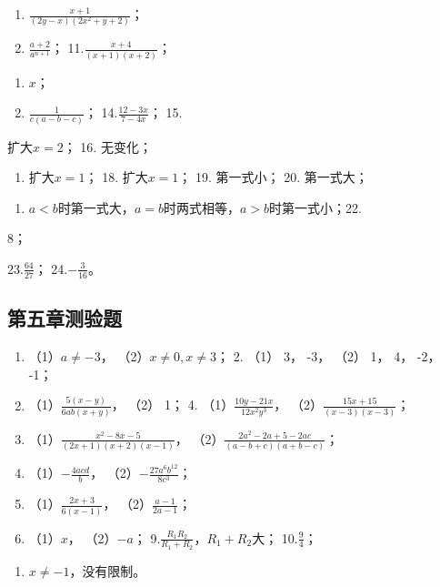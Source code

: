 \begin{enumerate}[start=9]
\item
  \(\frac{x + 1}{(2y - x)(2x^2 + y + 2)}\)；
\item
  \(\frac{a + 2}{a^{n + 1}}\)； 11.\(\frac{x + 4}{(x + 1)(x + 2)}\)；
\end{enumerate}
\begin{enumerate}[start=12]
\item
  \(x\)；
\item
  \(\frac{1}{c(a - b - c)}\)； 14.\(\frac{12 - 3x}{7 - 4x}\)； 15.
\end{enumerate}
扩大\(x = 2\)； 16. 无变化；

\begin{enumerate}[start=17]
\item
  扩大\(x = 1\)； 18. 扩大\(x = 1\)； 19. 第一式小； 20. 第一式大；
\end{enumerate}

\begin{enumerate}[start=21]
\item
  \(a < b\)时第一式大，\(a = b\)时两式相等，\(a > b\)时第一式小；22.
\end{enumerate}
8；

23.\(\frac{64}{27}\)； 24.\(-\frac{3}{16}\)。

\subsection{第五章测验题}

\begin{enumerate}
\item
  （1）\(a \neq -3\)， （2）\(x \neq 0, x \neq 3\)； 2. （1） 3， -3，
  （2） 1， 4， -2， -1；
\item
  （1）\(\frac{5(x - y)}{6ab(x + y)}\)， （2） 1； 4.
  （1）\(\frac{10y - 21x}{12x^2y^3}\)，
  （2）\(\frac{15x + 15}{(x - 3)(x - 3)}\)；
\item
  （1）\(\frac{x^2 - 8x - 5}{(2x + 1)(x + 2)(x - 1)}\)，
  （2）\(\frac{2a^2 - 2a + 5 - 2ac}{(a - b + c)(a + b - c)}\)；
\item
  （1）\(-\frac{4acd}{b}\)， （2）\(-\frac{27a^6b^{12}}{8c^3}\)；
\item
  （1）\(\frac{2x + 3}{6(x - 1)}\)， （2）\(\frac{a - 1}{2a - 1}\)；
\item
  （1）\(x\)， （2）\(-a\)；
  9.\(\frac{R_1R_2}{R_1 + R_2}\)，\(R_1 + R_2\)大； 10.\(\frac{9}{4}\)；
\end{enumerate}

\begin{enumerate}[start=11]
\item
  \(x \neq -1\)，没有限制。
\end{enumerate}

